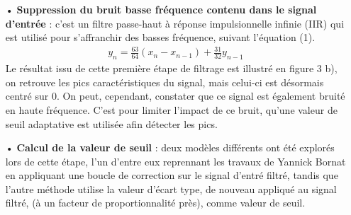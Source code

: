\documentclass[a4paper,12pt]{article}
\begin{document}
\begin{itemize}
\item[•] \textbf{Suppression du bruit basse fréquence contenu dans le signal d'entrée} : c'est un filtre passe-haut à réponse impulsionnelle infinie (IIR) qui est utilisé pour s'affranchir des basses fréquence, suivant l'équation (1).
\begin{eqnarray}
y_n = \frac{63}{64}\left(x_n - x_{n-1}\right) + \frac{31}{32}y_{n-1}
\end{eqnarray}
Le résultat issu de cette première étape de filtrage est illustré en figure 3 b), on retrouve les pics caractéristiques du signal, mais celui-ci est désormais centré sur 0. On peut, cependant, constater que ce signal est également bruité en haute fréquence. C'est pour limiter l'impact de ce bruit, qu'une valeur de seuil adaptative est utilisée afin détecter les pics.\\

\item[•] \textbf{Calcul de la valeur de seuil} : deux modèles différents ont été explorés lors de cette étape, l'un d'entre eux reprennant les travaux de Yannick Bornat en appliquant une boucle de correction sur le signal d'entré filtré, tandis que l'autre méthode utilise la valeur d'écart type, de nouveau appliqué au signal filtré, (à un facteur de proportionnalité près), comme valeur de seuil.\\


\end{itemize}
\end{document}

